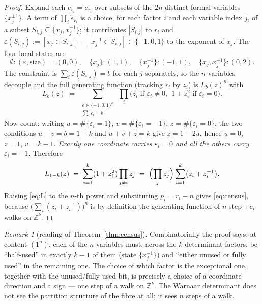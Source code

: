 \documentclass[11pt]{article}
\theoremstyle{plain}
\theoremstyle{definition}
\theoremstyle{remark}
\newtheorem{remark}[theorem]{Remark}
\newcommand{\Z}{\mathbb{Z}}
\newcommand{\edot}{\dot{e}}
\newcommand{\onen}{(1^{n})}
\begin{document}
\begin{proof}
Expand each $\edot_{r_i}=e_{r_i}$ over subsets of the $2n$ distinct formal variables
$\{x_j^{\pm1}\}$. A term of $\prod_{i}\edot_{r_i}$ is a choice, for each factor $i$ and
each variable index $j$, of a subset $S_{i,j}\subseteq\{x_j,x_j^{-1}\}$; it contributes
$|S_{i,j}|$ to $r_i$ and
$\varepsilon(S_{i,j}):=[x_j\in S_{i,j}]-[x_j^{-1}\in S_{i,j}]\in\{-1,0,1\}$
to the exponent of $x_j$. The four local states are
\[
  \emptyset:(\varepsilon,\text{size})=(0,0),\quad
  \{x_j\}:(1,1),\quad \{x_j^{-1}\}:(-1,1),\quad \{x_j,x_j^{-1}\}:(0,2).
\]
The constraint is $\sum_{i}\varepsilon(S_{i,j})=b$ for each $j$ separately, so the $n$
variables decouple and the full generating function (tracking $r_i$ by $z_i$) is
$L_b(z)^n$ with
\[
  L_b(z)\;=\;\sum_{\substack{\varepsilon\in\{-1,0,1\}^k\\ \sum_i\varepsilon_i=b}}
    \ \prod_{i}\bigl(z_i \text{ if }\varepsilon_i\ne0,\ \ 1+z_i^2 \text{ if }\varepsilon_i=0\bigr).
\]
Now count: writing $u=\#\{\varepsilon_i=1\}$, $v=\#\{\varepsilon_i=-1\}$,
$z=\#\{\varepsilon_i=0\}$, the two conditions $u-v=b=1-k$ and $u+v+z=k$ give
$z=1-2u$, hence $u=0$, $z=1$, $v=k-1$. \emph{Exactly one coordinate carries
$\varepsilon_i=0$ and all the others carry $\varepsilon_i=-1$.} Therefore
\begin{equation}\label{eq:L}
  L_{1-k}(z)\;=\;\sum_{i=1}^{k}(1+z_i^{2})\prod_{j\ne i}z_j
  \;=\;\Bigl(\prod_{j}z_j\Bigr)\sum_{i=1}^{k}\bigl(z_i+z_i^{-1}\bigr).
\end{equation}
Raising \eqref{eq:L} to the $n$-th power and substituting $p_i=r_i-n$ gives
\eqref{eq:census}, because $\bigl(\sum_i(z_i+z_i^{-1})\bigr)^n$ is by definition the
generating function of $n$-step $\pm e_i$ walks on $\Z^k$.
\end{proof}

\begin{remark}[reading of Theorem~\ref{thm:census}]
Combinatorially the proof says: at content $\onen$, each of the $n$ variables must,
across the $k$ determinant factors, be ``half-used'' in exactly $k-1$ of them (state
$\{x_j^{-1}\}$) and ``either unused or fully used'' in the remaining one. The choice of
which factor is the exceptional one, together with the unused/fully-used bit, is precisely
a choice of a coordinate direction and a sign --- one step of a walk on $\Z^k$. The
Warnaar determinant does not see the partition structure of the fibre at all; it sees
$n$ steps of a walk.
\end{remark}
\end{document}
